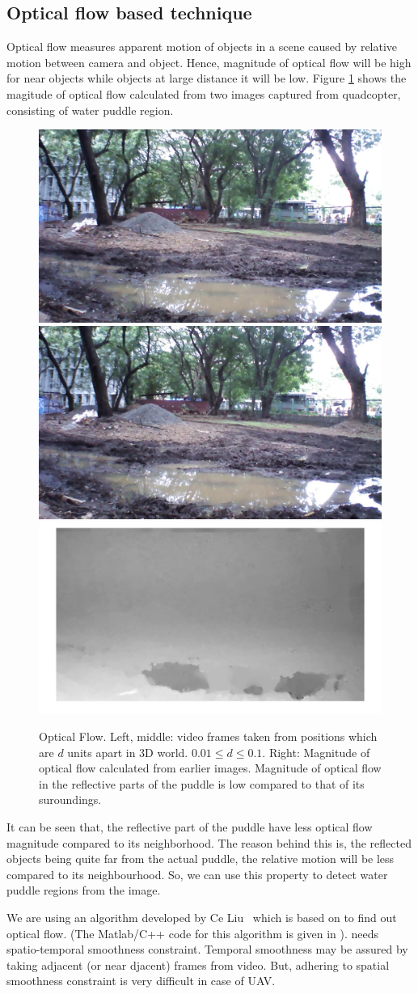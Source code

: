 \documentclass[times,10pt,twocolumn,letterpaper]{article}
\begin{document}
\subsection{Optical flow based technique}
Optical flow measures apparent motion of objects in a scene caused by relative
motion between camera and object. Hence, magnitude of optical flow will be high
for near objects while objects at large distance it will be low. Figure
\ref{fig:optical_flow} shows the magitude of optical flow calculated from two images
captured from quadcopter, consisting of water puddle region. 

\begin{figure}[h!]
\centering
\includegraphics[width=0.3\linewidth]{images/IMG_PAIR_1_1.jpg}
\includegraphics[width=0.3\linewidth]{images/IMG_PAIR_1_2.jpg}
\includegraphics[width=0.3\linewidth]{images/optical_flow_magnitude.jpg}
\caption{Optical Flow. Left, middle: video frames taken from positions
which are $d$ units apart in 3D world. $ 0.01 \leq d \leq 0.1$. Right:
Magnitude of optical flow calculated from earlier images. Magnitude of optical
flow in the reflective parts of the puddle is low compared to that of its
suroundings.}
\label{fig:optical_flow}
\end{figure}

It can be seen that, the reflective part of the puddle have less optical flow
magnitude compared to its neighborhood. The reason behind this is, the reflected objects being quite far
from the actual puddle, the relative motion will be less compared to its
neighbourhood. So, we can use this property to detect water puddle regions from
the image.

We are using an algorithm  developed by Ce Liu~\cite{Liu11Thesis} which is based
on \cite{Brox04,Bruhn05} to find out optical flow. (The Matlab/C++ code for this
algorithm is given in \cite{Liu11}). \cite{Brox04} needs spatio-temporal
smoothness constraint. Temporal smoothness may be assured by taking adjacent (or
near djacent) frames from video. But, adhering to spatial smoothness constraint
is very difficult in case of UAV. 
\end{document}
